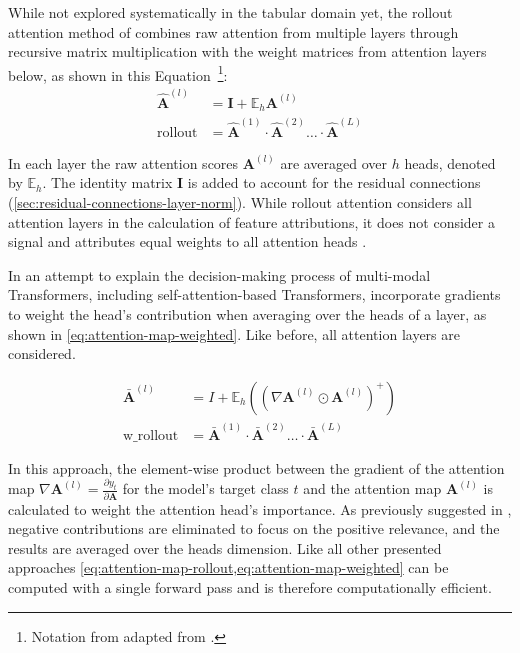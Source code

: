 While not explored systematically in the tabular domain yet, the rollout attention method of \textcite[][3]{abnarQuantifyingAttentionFlow2020} combines raw attention from multiple layers through recursive matrix multiplication with the weight matrices from attention layers below, as shown in this Equation~\footnote{Notation from adapted from \textcite[][786]{cheferTransformerInterpretabilityAttention2021}.}:
\begin{equation}
    \begin{aligned}
        \hat{\mathbf{A}}^{(l)} & =\mathbf{I}+\mathbb{E}_h \mathbf{A}^{(l)}                                                  \\
        \operatorname { rollout }  & =\hat{\mathbf{A}}^{(1)} \cdot \hat{\mathbf{A}}^{(2)} \ldots\cdot\hat{\mathbf{A}}^{(L)}
    \end{aligned}
    \label{eq:attention-map-rollout}
\end{equation}

In each layer the raw attention scores $\mathbf{A}^{(l)}$ are averaged over $h$ heads, denoted by $\mathbb{E}_h$. The identity matrix $\mathbf{I}$ is added to account for the residual connections (\cref{sec:residual-connections-layer-norm}). While rollout attention considers all attention layers in the calculation of feature attributions, it does not consider a signal and attributes equal weights to all attention heads \autocite[][786]{cheferTransformerInterpretabilityAttention2021}.

In an attempt to explain the decision-making process of multi-modal Transformers, including self-attention-based Transformers, \textcite[][3]{cheferTransformerInterpretabilityAttention2021} incorporate gradients to weight the head's contribution when averaging over the heads of a layer, as shown in \cref{eq:attention-map-weighted}. Like before, all attention layers are considered.

\begin{equation}
    \begin{aligned}
        \bar{\mathbf{A}}^{(l)} & =I+ \mathbb{E}_h\left(\left(\nabla \mathbf{A}^{(l)} \odot \mathbf{A}^{(l)}\right)^{+}\right) \\
        \operatorname {w\_rollout} & =\bar{\mathbf{A}}^{(1)} \cdot \bar{\mathbf{A}}^{(2)} \ldots \cdot \bar{\mathbf{A}}^{(L)}
    \end{aligned}
    \label{eq:attention-map-weighted}
\end{equation}

In this approach, the element-wise product between the gradient of the attention map $\nabla \mathbf{A}^{(l)}=\frac{\partial y_t}{\partial \mathbf{A}}$ for the model's target class $t$ and the attention map $\mathbf{A}^{(l)}$ is calculated to weight the attention head's importance. As previously suggested in \textcite[][786]{cheferTransformerInterpretabilityAttention2021}, negative contributions are eliminated to focus on the positive relevance, and the results are averaged over the heads dimension. Like all other presented approaches \cref{eq:attention-map-rollout,eq:attention-map-weighted} can be computed with a single forward pass and is therefore computationally efficient.

